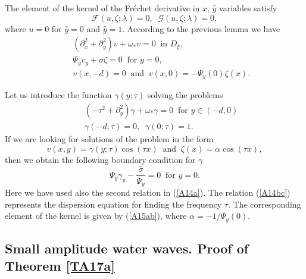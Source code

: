 \documentclass[a4paper,reqno,12pt]{amsart}
\theoremstyle{plain}
\theoremstyle{definition}
\numberwithin{equation}{section}
\begin{document}
The element of the  kernel of the Fr\'{e}chet derivative in $\hat{x}$, $\hat{y}$ variables satisfy
$$
{\mathcal F}(u,\zeta;\lambda)=0,\;\;{\mathcal G}(u,\zeta;\lambda)=0,
$$
where $u=0$ for $\hat{y}=0$ and $\hat{y}=1$. According to the previous lemma we have
\begin{eqnarray}\label{A15aa}
&&(\partial_x^2+\partial_y^2)v+\omega_*v=0
\;\;\mbox{in $D_\xi$},\nonumber\\
&&\Psi_yv_y+\hat{\sigma}\zeta=0\;\;
\mbox{for $y=0$},\nonumber\\
&&v(x,-d)=0\;\;\mbox{and}\;\;v(x,0)=-\Psi_y(0)\zeta(x).
\end{eqnarray}

Let us introduce the function $\gamma(y;\tau)$  solving the problems
\begin{eqnarray}\label{A14b}
&&(-\tau^2+\partial_y^2)\gamma+\omega_*\gamma=0
\;\;\mbox{for $y\in (-d,0)$}\nonumber\\
&&\gamma(-d;\tau)=0,\;\; \gamma(0;\tau)=1.
\end{eqnarray}
If we are looking for solutions of the  problem in the form
\begin{equation}\label{A15ab}
v(x,y)=\gamma(y;\tau)\cos(\tau x)\;\;\mbox{and}\;\;\zeta(x)=\alpha\cos(\tau x),
\end{equation}
then
 we obtain the following boundary condition for $\gamma$
\begin{equation}\label{A14bc}
\Psi_y\gamma_y-\frac{\hat{\sigma}}{\Psi_y}=0\;\;\mbox{for $y=0$}.
\end{equation}
Here we have used also the second relation in (\ref{A14a}). The relation (\ref{A14bc}) represents the dispersion equation for finding the frequency $\tau$. The corresponding element of the kernel is given by (\ref{A15ab}), where
$\alpha=-1/\Psi_y(0)$.








\subsection{Small amplitude water waves. Proof of Theorem \ref{TA17a}}
\end{document}
